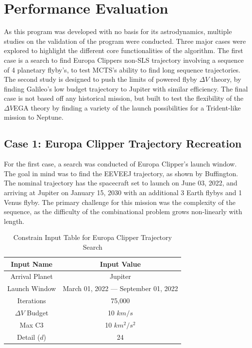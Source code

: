 \documentclass[letterpaper, preprint, paper,11pt]{AAS}	%
\begin{document}

\section{Performance Evaluation}

As this program was developed with no basis for its astrodynamics, multiple studies on the validation of the program were conducted. Three major cases were explored to highlight the different core functionalities of the algorithm. The first case is a search to find Europa Clippers non-SLS trajectory involving a sequence of 4 planetary flyby's, to test MCTS's ability to find long sequence trajectories. The second study is designed to push the limits of powered flyby $\Delta V$ theory, by finding Galileo's low budget trajectory to Jupiter with similar efficiency. The final case is not based off any historical mission, but built to test the flexibility of the $\Delta V$EGA theory by finding a variety of the launch possibilities for a Trident-like mission to Neptune.

\subsection{Case 1: Europa Clipper Trajectory Recreation}

For the first case, a search was conducted of Europa Clipper's launch window. The goal in mind was to find the EEVEEJ trajectory, as shown by Buffington\cite{Buffington2014}. The nominal trajectory has the spacecraft set to launch on June 03, 2022, and arriving at Jupiter on January 15, 2030 with an additional 3 Earth flybys and 1 Venus flyby. The primary challenge for this mission was the complexity of the sequence, as the difficulty of the combinational problem grows non-linearly with length.
\begin{table}[htb]
\begin{center}
    \caption{Constrain Input Table for Europa Clipper Trajectory Search}
    \label{table:clipInputs}
    \begin{tabular}{c|c}
        \textbf{Input Name} & \textbf{Input Value}\\
        \hline
        Arrival Planet & Jupiter \\
        Launch Window & March 01, 2022 --- September 01, 2022 \\
        Iterations & 75,000 \\ 
        $\Delta V$ Budget & 10 $km/s$ \\
        Max C3 & 10 $km^2/s^2$ \\
        Detail ($d$) & 24 
    \end{tabular}
\end{center}
\end{table}
\end{document}
